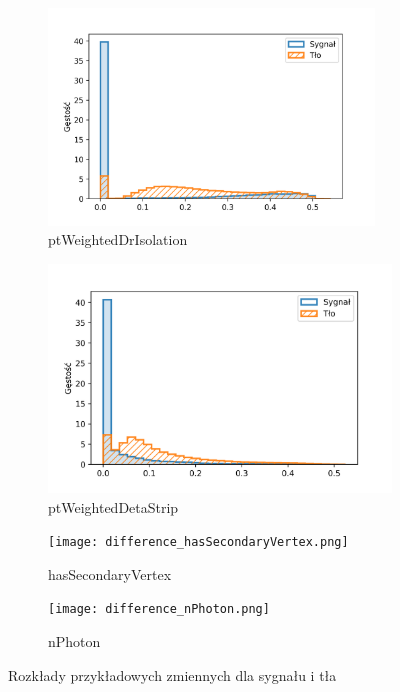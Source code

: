 \documentclass{pracalicmgr}
\begin{document}
\begin{figure}
\begin{subfigure}{.5\textwidth}
	\includegraphics[width=0.95\textwidth]{difference_ptWeightedDrIsolation.png}
	\caption{ptWeightedDrIsolation}
	\end{subfigure}
	\begin{subfigure}{.5\textwidth}
	\centering
	\includegraphics[width=1\textwidth]{difference_ptWeightedDetaStrip.png}
	\caption{ptWeightedDetaStrip}
	\end{subfigure}
	\begin{subfigure}{.5\textwidth}
	\centering
	\texttt{[image: difference\_hasSecondaryVertex.png]}
	\caption{hasSecondaryVertex}
	\end{subfigure}
	\begin{subfigure}{.5\textwidth}
	\centering
	\texttt{[image: difference\_nPhoton.png]}
	\caption{nPhoton}
	\end{subfigure}
	\caption{Rozkłady przykładowych zmiennych dla sygnału i tła}
	\label{fig:diff}
	\end{figure}	
\end{document}

